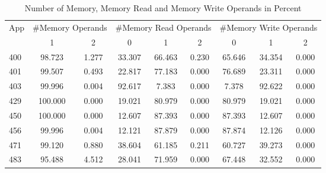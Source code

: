 \begin{Solution}
\begin{table}[H]
    \centering
    \caption{Number of Memory, Memory Read and Memory Write Operands in Percent}
    \label{tab:pD:num_mem_operands}
    \begin{tabular}{| l | c | c | c | c | c | c | c | c |}
        \hline
        \multirow{2}{*}{App} & \multicolumn{2}{c|}{\#Memory Operands} & \multicolumn{3}{c|}{\#Memory Read Operands} & \multicolumn{3}{c|}{\#Memory Write Operands} \\
        \cline{2-3}\cline{4-6}\cline{7-9}
        & 1 & 2 & 0 & 1 & 2 & 0 & 1 & 2 \\
        \hline
        400 & 98.723 & 1.277 & 33.307 & 66.463 & 0.230 & 65.646 & 34.354 & 0.000 \\
        \hline
        401 & 99.507 & 0.493 & 22.817 & 77.183 & 0.000 & 76.689 & 23.311 & 0.000 \\
        \hline
        403 & 99.996 & 0.004 & 92.617 & 7.383 & 0.000 & 7.378 & 92.622 & 0.000 \\
        \hline
        429 & 100.000 & 0.000 & 19.021 & 80.979 & 0.000 & 80.979 & 19.021 & 0.000 \\
        \hline
        450 & 100.000 & 0.000 & 12.607 & 87.393 & 0.000 & 87.393 & 12.607 & 0.000 \\
        \hline
        456 & 99.996 & 0.004 & 12.121 & 87.879 & 0.000 & 87.874 & 12.126 & 0.000 \\
        \hline
        471 & 99.120 & 0.880 & 38.604 & 61.185 & 0.211 & 60.727 & 39.273 & 0.000 \\
        \hline
        483 & 95.488 & 4.512 & 28.041 & 71.959 & 0.000 & 67.448 & 32.552 & 0.000 \\
        \hline
    \end{tabular}
\end{table}


\end{Solution}
